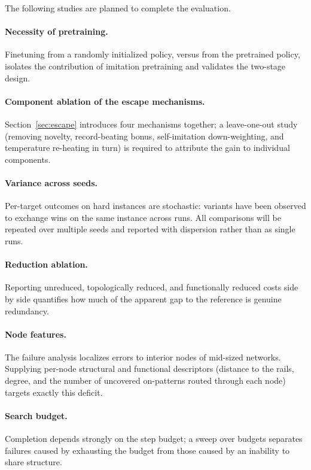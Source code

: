 \documentclass[11pt, a4paper]{article}
\theoremstyle{plain}
\theoremstyle{definition}
\theoremstyle{remark}
\begin{document}
The following studies are planned to complete the evaluation.

\paragraph{Necessity of pretraining.}
Finetuning from a randomly initialized policy, versus from the pretrained
policy, isolates the contribution of imitation pretraining and validates
the two-stage design.

\paragraph{Component ablation of the escape mechanisms.}
Section~\ref{sec:escape} introduces four mechanisms together; a
leave-one-out study (removing novelty, record-beating bonus,
self-imitation down-weighting, and temperature re-heating in turn) is
required to attribute the gain to individual components.

\paragraph{Variance across seeds.}
Per-target outcomes on hard instances are stochastic: variants have been
observed to exchange wins on the same instance across runs.  All
comparisons will be repeated over multiple seeds and reported with
dispersion rather than as single runs.

\paragraph{Reduction ablation.}
Reporting unreduced, topologically reduced, and functionally reduced
costs side by side quantifies how much of the apparent gap to the
reference is genuine redundancy.

\paragraph{Node features.}
The failure analysis localizes errors to interior nodes of mid-sized
networks.  Supplying per-node structural and functional descriptors
(distance to the rails, degree, and the number of uncovered on-patterns
routed through each node) targets exactly this deficit.

\paragraph{Search budget.}
Completion depends strongly on the step budget; a sweep over budgets
separates failures caused by exhausting the budget from those caused by
an inability to share structure.
\end{document}
